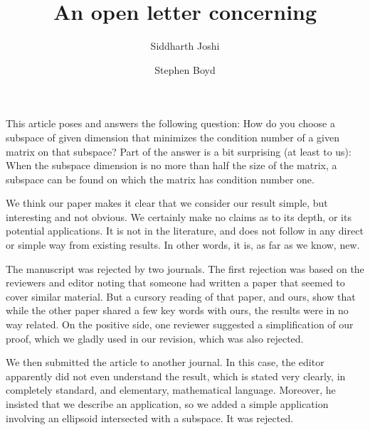 \documentclass[11pt]{article}
\title{\bf An open letter concerning \\
\vspace{5mm}{Subspaces that Minimize the Condition Number of
a Matrix}}
\author{Siddharth Joshi \and Stephen Boyd}
\date{}
\begin{document}
\maketitle
\thispagestyle{empty}

This article poses and answers the following question: 
How do you choose a subspace
of given dimension that minimizes the
condition number of a given matrix on that subspace?
Part of the answer is a bit surprising
(at least to us):  When  the subspace dimension is
no more than half the size of the matrix, a subspace can be
found on which the matrix has condition number one.

We think our paper makes it clear that we consider our result
simple, but interesting and not obvious.  We certainly make no claims as to
its depth, or its potential applications.
It is not in the literature, and does not follow
in any direct or simple way from existing results.
In other words, it is, as far as we know, new.

The manuscript was rejected by two journals.
The first rejection was based on the reviewers and editor
noting that someone had written a paper that seemed to cover
similar material.  But a cursory reading of that paper, and ours,
show that while the other paper shared a few key words with ours,
the results were in no way related.
On the positive side, one reviewer suggested a simplification of
our proof, which we gladly used in our revision, which was also
rejected.

We then submitted the article to another journal. 
In this case, the editor apparently did not even understand the
result, which is stated very clearly, in completely standard,
and elementary, mathematical language.
Moreover, he insisted that we describe an application, so we added
a simple application involving an ellipsoid intersected with
a subspace.  It was rejected.
\end{document}

